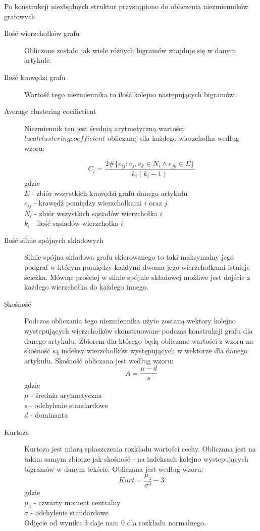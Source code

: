 Po konstrukcji niezbędnych struktur przystąpiono do obliczenia niezmienników grafowych.

\begin{description}
\item [Ilość wierzchołków grafu]
Obliczone zostało jak wiele różnych bigramów znajduje się w danym artykule.
\item [Ilość krawędzi grafu]
Wartość tego niezmiennika to ilość kolejno następujących bigramów.
\item[Average clustering coeffictient]
Niezmiennik ten jest średnią arytmetyczną wartości $local clustering coefficient$ obliczanej dla każdego wierzchołka według wzoru:

$$C_i = \frac{2\#\{ e_{ij} : v_j, v_k \in N_i \land  e_{jk} \in E\}}{k_i(k_i - 1)}$$
gdzie\\
$E$ - zbiór wszystkich krawędzi grafu danego artykułu\\
$e_{ij}$ - krawędź pomiędzy wierzchołkami $i$ oraz $j$\\
$N_i$ - zbiór wszystkich sąsiadów wierzchołka $i$\\
$k_i$ - ilość sąsiadów wierzchołka $i$\\

 \item [Ilość silnie spójnych składowych]
 Silnie spójna składowa grafu skierowanego to taki maksymalny jego podgraf w którym pomiędzy każdymi dwoma jego wierzchołkami istnieje ścieżka. Mówiąc prościej w silnie spójnie składowej możliwe jest dojście z każdego wierzchołka do każdego innego.
 
 \item [Skośność]
 Podczas obliczania tego niezmiennika użyte zostaną wektory kolejno wystepujących wierzchołków skonstruowane podczas konstrukcji grafu dla danego artykułu. Zbiorem dla którego będą obliczane wartości z wzoru na skośność są indeksy wierzchołków występujących w wektorze dla danego artykułu.
 Skośność obliczana jest według wzoru:
$$A = \frac{\mu - d}{s}$$
gdzie\\
$\mu$ - średnia arytmetyczna\\
$s$ - odchylenie standardowe\\
$d$ - dominanta\\

\item[Kurtoza]
Kurtoza jest miarą spłaszczenia rozkładu wartości cechy. Obliczana jest na takim samym zbiorze jak skośność - na indeksach kolejno wystepujących bigramów w danym tekście. Obliczana jest według wzoru:
$$Kurt = \frac{\mu_4}{\sigma^4} - 3$$
gdzie\\
$\mu_4$ - czwarty moment centralny\\
$\sigma$ - odchylenie standardowe\\

Odjęcie od wyniku 3 daje nam 0 dla rozkładu normalnego.

\end{description}

